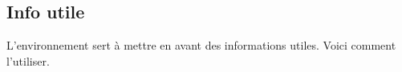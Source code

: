 

\usepackage[lang = french]{../main/main}
\usepackage{../macroenv/macroenv}
\usepackage{../showcase/showcase}
\usepackage{../listing/listing}
\usepackage{../inenglish/inenglish}


\usepackage{focus}





\subsection{Info utile}

L'environnement  sert à mettre en avant des informations utiles. Voici comment l'utiliser.




